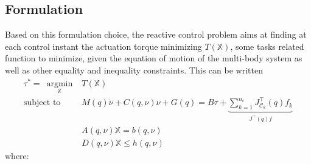 \documentclass[12pt,a4paper,twoside]{article}
\newcommand{\vect}[1]{\mbox{\boldmath${#1}$}}%
\DeclareMathOperator*{\argmin}{argmin}
\begin{document}
\subsection{Formulation}
Based on this formulation choice, the reactive control problem aims at finding at each control instant the actuation torque minimizing $T(\mathbb{X})$, some tasks related function to minimize, given the equation of motion of the multi-body system as well as other equality and inequality constraints. This can be written
\begin{subequations}\label{eq:one task}
\begin{eqnarray}
{\tau}^* =~\argmin \limits_{\mathbb{X}} & T(\mathbb{X}) \label{eq:cp obj}\\  
\text{subject to} 
  & {M}(q) {\dot{\nu}}+{C}({q},{\nu}){\nu} + G(q) = {B} {\tau} + \underbrace{\sum_{k = 1}^{n_c} {J}^\top_{\mathcal{C}_k}(q) f_k}_{J^\top(q) f} \label{eq:cp dyn model}\\ 
  & {A}(q,\nu) \mathbb{X}   =  {b}(q,\nu)  \label{eq:cp eq cons} \\
  & {D}(q,\nu) \mathbb{X} \leq {h}(q,\nu)  \label{eq:cp ineq cons}
\end{eqnarray}               
\end{subequations}
where:
\end{document}
